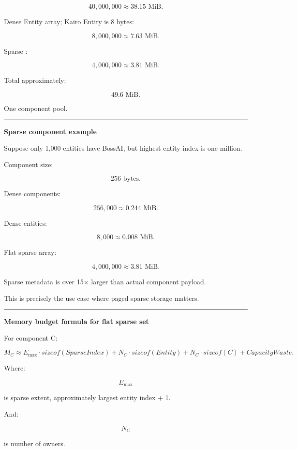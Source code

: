 \[
40,000,000
\approx38.15\text{ MiB}.
\]

Dense Entity array; Kairo Entity is 8 bytes:

\[
8,000,000
\approx7.63\text{ MiB}.
\]

Sparse :

\[
4,000,000
\approx3.81\text{ MiB}.
\]

Total approximately:

\[
49.6\text{ MiB}.
\]

One component pool.

\begin{center}\rule{0.5\linewidth}{0.5pt}\end{center}

\textbf{Sparse component example}

Suppose only 1,000 entities have BossAI, but highest entity index is one million.

Component size:

\[
256\text{ bytes}.
\]

Dense components:

\[
256,000
\approx0.244\text{ MiB}.
\]

Dense entities:

\[
8,000
\approx0.008\text{ MiB}.
\]

Flat sparse array:

\[
4,000,000
\approx3.81\text{ MiB}.
\]

Sparse metadata is over 15× larger than actual component payload.

This is precisely the use case where paged sparse storage matters.

\begin{center}\rule{0.5\linewidth}{0.5pt}\end{center}

\textbf{Memory budget formula for flat sparse set}

For component C:

\[
\boxed{
M_C
\approx
E_{\max}\cdot sizeof(SparseIndex)
+
N_C\cdot sizeof(Entity)
+
N_C\cdot sizeof(C)
+
CapacityWaste.
}
\]

Where:

\[
E_{\max}
\]

is sparse extent, approximately largest entity index + 1.

And:

\[
N_C
\]

is number of owners.

